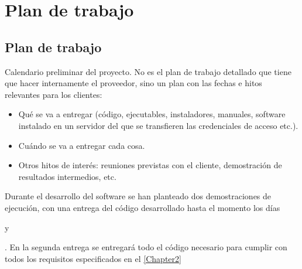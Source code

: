 
\chapter{Plan de trabajo} %

\label{Chapter4} %


\section{Plan de trabajo}

Calendario preliminar del proyecto. No es el plan de trabajo detallado que tiene que hacer internamente el proveedor, sino un plan con las fechas e hitos relevantes para los clientes:

\begin{itemize}
	\item Qué se va a entregar (código, ejecutables, instaladores, manuales, software instalado en un servidor del que se transfieren las credenciales de acceso etc.).
	\item Cuándo se va a entregar cada cosa.
	\item Otros hitos de interés: reuniones previstas con el cliente, demostración de resultados intermedios, etc.
\end{itemize}

Durante el desarrollo del software se han planteado dos demostraciones de ejecuci\'on, con una entrega del c\'odigo desarrollado hasta el momento los d\'ias \date{09 march} y \date{01 june}. En la segunda entrega se entregar\'a todo el c\'odigo necesario para cumplir con todos los requisitos especificados en el \ref{Chapter2}

